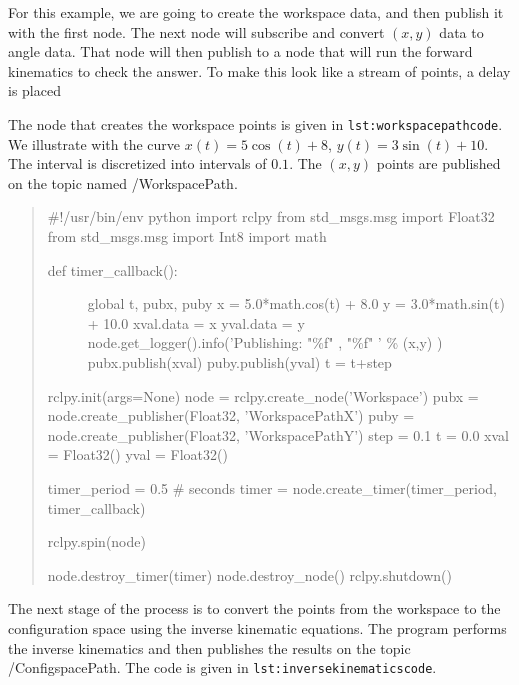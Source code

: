 For this example, we are going to create the workspace data, and then
publish it with the first node. The next node will subscribe and convert
\((x,y)\) data to angle data. That node will then publish to a node that
will run the forward kinematics to check the answer. To make this look
like a stream of points, a delay is placed

The node that creates the workspace points is given in
\texttt{lst:workspacepathcode}. We illustrate with the curve
\(x(t) = 5\cos(t)+8\), \(y(t) = 3\sin(t)+10\). The interval is
discretized into intervals of \(0.1\). The \((x,y)\) points are
published on the topic named /WorkspacePath.

\begin{quote}
\#!/usr/bin/env python import rclpy from std\_msgs.msg import Float32
from std\_msgs.msg import Int8 import math

\begin{description}
\item[def timer\_callback():]
global t, pubx, puby x = 5.0*math.cos(t) + 8.0 y = 3.0*math.sin(t) +
10.0 xval.data = x yval.data = y node.get\_logger().info('Publishing:
"\%f" , "\%f" ' \% (x,y) ) pubx.publish(xval) puby.publish(yval) t =
t+step
\end{description}

rclpy.init(args=None) node = rclpy.create\_node('Workspace') pubx =
node.create\_publisher(Float32, 'WorkspacePathX') puby =
node.create\_publisher(Float32, 'WorkspacePathY') step = 0.1 t = 0.0
xval = Float32() yval = Float32()

timer\_period = 0.5 \# seconds timer = node.create\_timer(timer\_period,
timer\_callback)

rclpy.spin(node)

node.destroy\_timer(timer) node.destroy\_node() rclpy.shutdown()
\end{quote}

The next stage of the process is to convert the points from the
workspace to the configuration space using the inverse kinematic
equations. The program performs the inverse kinematics and then
publishes the results on the topic /ConfigspacePath. The code is given
in \texttt{lst:inversekinematicscode}.

